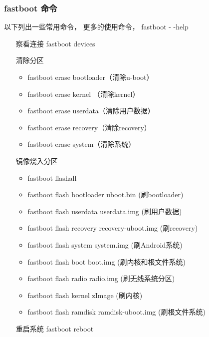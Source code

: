 \documentclass[a4paper,titlepage]{article}
\begin{document}
\subsubsection{fastboot 命令}
以下列出一些常用命令， 更多的使用命令， fastboot - -help

\begin{enumerate}
    \item [察看连接] 
        fastboot devices 

    \item [清除分区] 
        \begin{itemize}
            \item fastboot erase bootloader（清除u-boot） 
            \item fastboot erase kernel （清除kernel） 
            \item fastboot erase userdata（清除用户数据） 
            \item fastboot erase recovery（清除recovery） 
            \item fastboot erase system（清除系统） 
        \end{itemize} 

    \item [镜像烧入分区] 
        \begin{itemize}
            \item fastboot flashall
            \item fastboot flash bootloader uboot.bin         (刷bootloader) 
            \item fastboot flash userdata userdata.img        (刷用户数据) 
            \item fastboot flash recovery recovery-uboot.img  (刷recovery)
            \item fastboot flash system system.img            (刷Android系统)
            \item fastboot flash boot boot.img                (刷内核和根文件系统)
            \item fastboot flash radio radio.img              (刷无线系统分区)
            \item fastboot flash kernel zImage                (刷内核)
            \item fastboot flash ramdisk ramdisk-uboot.img    (刷根文件系统)
        \end{itemize}

    \item [重启系统] 
        fastboot reboot 
\end{enumerate}
\end{document}
